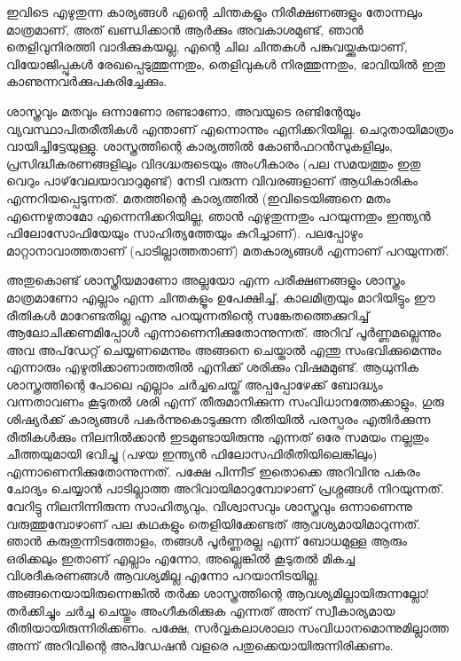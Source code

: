 \vskip 2pt

ഇവിടെ എഴുതുന്ന കാര്യങ്ങള്‍ എന്റെ ചിന്തകളും നിരീക്ഷണങ്ങളും തോന്നലും മാത്രമാണ്, അത് ഖണ്ഡിക്കാന്‍ ആര്‍ക്കും 
അവകാശമുണ്ട്, ഞാന്‍ തെളിവുനിരത്തി വാദിക്കുകയല്ല, എന്റെ ചില ചിന്തകള്‍ പങ്കുവയ്ക്കുകയാണ്, വിയോജിപ്പുകള്‍ 
രേഖപ്പെടുത്തുന്നതും, തെളിവുകള്‍ നിരത്തുന്നതും, ഭാവിയില്‍ ഇതു കാണുന്നവര്‍ക്കുപകരിച്ചേക്കും.

ശാസ്ത്രവും മതവും ഒന്നാണോ രണ്ടാണോ, അവയുടെ രണ്ടിന്റേയും വ്യവസ്ഥാപിതരീതികള്‍ എന്താണ് എന്നൊന്നും 
എനിക്കറിയില്ല. ചെറുതായിമാത്രം വായിച്ചിട്ടേയുള്ളു. ശാസ്ത്രത്തിന്റെ കാര്യത്തില്‍ കോണ്‍ഫറന്‍സുകളിലും, 
പ്രസിദ്ധീകരണങ്ങളിലും വിദഗ്ദ്ധരുടെയും അംഗീകാരം (പല സമയത്തും ഇതു വെറും പാഴ്‌വേലയാവാറുമുണ്ട്) നേടി വരുന്ന 
വിവരങ്ങളാണ് ആധികാരികം എന്നറിയപ്പെടുന്നത്. മതത്തിന്റെ കാര്യത്തില്‍ (ഇവിടെയിങ്ങനെ മതം എന്നെഴുതാമോ 
എന്നെനിക്കറിയില്ല, ഞാന്‍ എഴുതുന്നതും പറയുന്നതും ഇന്ത്യന്‍ ഫിലോസോഫിയേയും സാഹിത്യത്തേയും കുറിച്ചാണ്). 
പലപ്പോഴും മാറ്റാനാവാത്തതാണ് (പാടില്ലാത്തതാണ്) മതകാര്യങ്ങള്‍ എന്നാണ് പറയുന്നത്.

അതുകൊണ്ട് ശാസ്ത്രീയമാണോ അല്ലയോ എന്ന പരീക്ഷണങ്ങളും ശാസ്ത്രം മാത്രമാണോ എല്ലാം എന്ന ചിന്തകളൂം ഉപേക്ഷിച്ച്, 
കാലമിത്രയും മാറിയിട്ടും ഈ രീതികള്‍ മാറേണ്ടതില്ല എന്നു പറയുന്നതിന്റെ സങ്കേതത്തെക്കുറിച്ച് ആലോചിക്കണമിപ്പോള്‍ 
എന്നാണെനിക്കുതോന്നുന്നത്. അറിവ് പൂര്‍ണ്ണമല്ലെന്നും അവ അപ്‌ഡേറ്റ് ചെയ്യണമെന്നും അങ്ങനെ ചെയ്താല്‍ എന്തു 
സംഭവിക്കുമെന്നും എന്നാരും എഴുതിക്കാണാത്തതില്‍ എനിക്ക് ശരിക്കും വിഷമമുണ്ട്. ആധുനിക ശാസ്ത്രത്തിന്റെ പോലെ 
എല്ലാം ചര്‍ച്ചചെയ്ത് അപ്പപ്പോഴേക്ക് ബോദ്ധ്യം വന്നതാവണം കൂടുതല്‍ ശരി എന്ന് തീരുമാനിക്കുന്ന സംവിധാനത്തേക്കാളും, 
ഗുരു ശിഷ്യര്‍ക്ക് കാര്യങ്ങള്‍ പകര്‍ന്നുകൊടുക്കുന്ന രീതിയില്‍ പരസ്പരം എതിര്‍ക്കുന്ന രീതികള്‍ക്കും നിലനില്‍ക്കാന്‍ 
ഇടമുണ്ടായിരുന്നു എന്നത് ഒരേ സമയം നല്ലതും ചീത്തയുമായി ഭവിച്ചു (പഴയ ഇന്ത്യന്‍ ഫിലോസഫിരീതിയിലെങ്കിലും) 
എന്നാണെനിക്കുതോന്നുന്നത്. പക്ഷേ പിന്നീട് ഇതൊക്കെ അറിവിനു പകരം ചോദ്യം ചെയ്യാന്‍ പാടില്ലാത്ത അറിവായിമാറുമ്പോഴാണ് 
പ്രശ്നങ്ങള്‍ നിറയുന്നത്. വേറിട്ടു നിലനിന്നിരുന്ന സാഹിത്യവും, വിശ്വാസവും ശാസ്ത്രവും ഒന്നാണെന്നു വരുത്തുമ്പോഴാണ് 
പല കഥകളും തെളിയിക്കേണ്ടത് ആവശ്യമായിമാറുന്നത്. ഞാന്‍ കരുതുന്നിടത്തോളം, തങ്ങള്‍ പൂര്‍ണ്ണരല്ല എന്ന് ബോധമുള്ള 
ആരും ഒരിക്കലും ഇതാണ് എല്ലാം എന്നോ, അല്ലെങ്കില്‍ കൂടുതല്‍ മികച്ച വിശദീകരണങ്ങള്‍ ആവശ്യമില്ല എന്നോ പറയാനിടയില്ല. 
അങ്ങനെയായിരുന്നെങ്കില്‍ തര്‍ക്ക ശാസ്ത്രത്തിന്റെ ആവശ്യമില്ലായിരുന്നല്ലോ! തര്‍ക്കിച്ചും ചര്‍ച്ച ചെയ്തും അംഗീകരിക്കുക 
എന്നത് അന്ന് സ്വീകാര്യമായ രീതിയായിരുന്നിരിക്കണം. പക്ഷേ, സര്‍വ്വകലാശാലാ സംവിധാനമൊന്നുമില്ലാത്ത അന്ന് അറിവിന്റെ
അപ്ഡേഷന്‍ വളരെ പതുക്കെയായിരുന്നിരിക്കണം.

